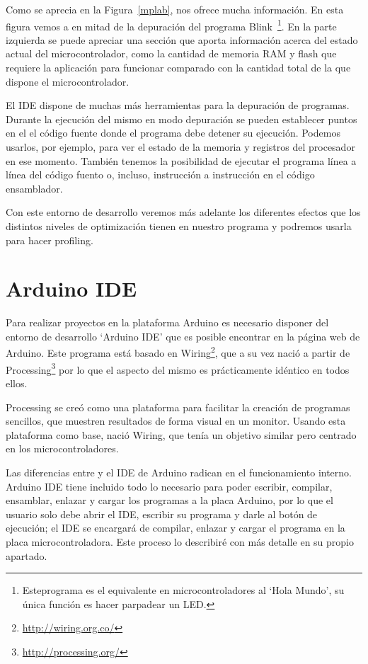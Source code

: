 
Como se aprecia en la Figura~\ref{mplab},  nos ofrece mucha información. En esta figura vemos a  en mitad de la depuración del programa Blink~\footnote{Esteprograma es el equivalente en microcontroladores al `Hola Mundo', su única función es hacer parpadear un LED.}. En la parte izquierda se puede apreciar una sección que aporta información acerca del estado actual del microcontrolador, como la cantidad de memoria RAM y flash que requiere la aplicación para funcionar comparado con la cantidad total de la que dispone el microcontrolador.

El IDE dispone de muchas más herramientas para la depuración de programas. Durante la ejecución del mismo en modo depuración se pueden establecer puntos en el el código fuente donde el programa debe detener su ejecución. Podemos usarlos, por ejemplo, para ver el estado de la memoria y registros del procesador en ese momento. También tenemos la posibilidad de ejecutar el programa línea a línea del código fuento o, incluso, instrucción a instrucción en el código ensamblador.

Con este entorno de desarrollo veremos más adelante los diferentes efectos que los distintos niveles de optimización tienen en nuestro programa y podremos usarla para hacer profiling.

\section{Arduino IDE}
Para realizar proyectos en la plataforma Arduino es necesario disponer del entorno de desarrollo `Arduino IDE' que es posible encontrar en la página web de Arduino. Este programa está basado en Wiring\footnote{\url{http://wiring.org.co/}}, que a su vez nació a partir de Processing\footnote{\url{http://processing.org/}} por lo que el aspecto del mismo es prácticamente idéntico en todos ellos. 

Processing se creó como una plataforma para facilitar la creación de programas sencillos, que muestren resultados de forma visual en un monitor. Usando esta plataforma como base, nació Wiring, que tenía un objetivo similar pero centrado en los microcontroladores.

Las diferencias entre  y el IDE de Arduino radican en el funcionamiento interno. Arduino IDE tiene incluido todo lo necesario para poder escribir, compilar, ensamblar, enlazar y cargar los programas a la placa Arduino, por lo que el usuario solo debe abrir el IDE, escribir su programa y darle al botón de ejecución; el IDE se encargará de compilar, enlazar y cargar el programa en la placa microcontroladora. Este proceso lo describiré con más detalle en su propio apartado.

